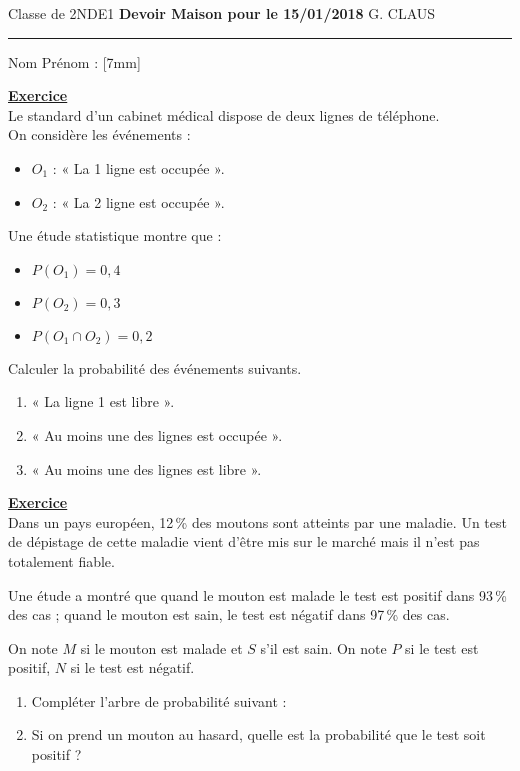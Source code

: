 \documentclass[a4paper,12pt]{article}
\newcommand{\lignepoints}
  {\raisebox{-.1cm}[7mm]{}\makebox[0pt]{}\textcolor{gris}{\dotfill}\makebox[0pt]{}}
\newcounter{exo}
\newcommand{\ex}[2][]{
  \vspace{1ex}

  \noindent
  \textbf{\underline{Exercice \arabic{exo}} #1\\ }
   \stepcounter{exo}
  \noindent #2
}
\begin{document}
        Classe de 2NDE1  \hfill {\large \textbf{Devoir Maison pour le 15/01/2018}} \hfill G. CLAUS
        
        \vspace{1mm}
        \hrule
        \vspace{1mm}
        Nom Prénom :  \lignepoints{} \\
        
        \ex{
       Le standard d’un cabinet médical dispose de deux lignes de téléphone. \\
    On considère les événements :    
    \begin{itemize}
        \item $O_1$ : « La 1\up{ère} ligne est occupée ».
        \item $O_2$ : « La 2\up{ème} ligne est occupée ».
    \end{itemize}
    Une étude statistique montre que :
    \begin{itemize}
        \item $P(O_1) = 0,4$
        \item $P(O_2) = 0,3$
        \item $P(O_1 \cap O_2 ) = 0,2$
    \end{itemize}
    Calculer la probabilité des événements suivants.
    \begin{enumerate}
        \item « La ligne 1 est libre ».
        \item « Au moins une des lignes est occupée ».
        \item « Au moins une des lignes est libre ».
    \end{enumerate}
    }
    
    \ex{
    Dans un pays européen, 12\,\% des moutons sont atteints par une maladie. 
    Un test de dépistage de cette maladie vient d'être mis sur le marché mais il n'est pas totalement fiable.

    Une étude a montré que quand le mouton est malade le test est positif dans 93\,\% des cas ; 
    quand le mouton est sain, le test est négatif dans 97\,\% des cas.

    On note $M$ si le mouton est malade et $S$ s'il est sain. On note $P$ si le test est positif, $N$ si le test est négatif.

    \begin{enumerate}
        \item Compléter l'arbre de probabilité suivant :\\ 
         \item Si on prend un mouton au hasard, quelle est la probabilité que le test soit positif ?
    \end{enumerate}
    }
        
\end{document}
